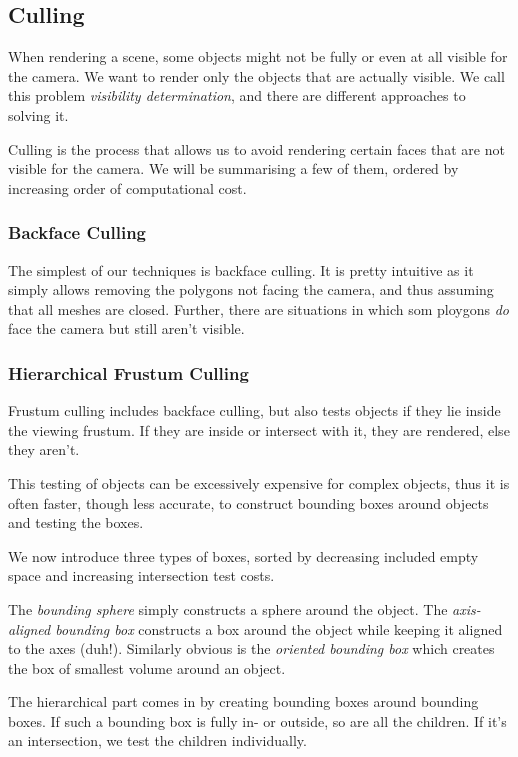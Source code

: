 \documentclass{panikzettel}
\begin{document}
\subsection{Culling}

When rendering a scene, some objects might not be fully or even at all visible for the camera. We want to render only the objects that are actually visible. We call this problem \emph{visibility determination}, and there are different approaches to solving it.

Culling is the process that allows us to avoid rendering certain faces that are not visible for the camera. We will be summarising a few of them, ordered by increasing order of computational cost.

\subsubsection*{Backface Culling}

The simplest of our techniques is backface culling. It is pretty intuitive as it simply allows removing the polygons not facing the camera, and thus assuming that all meshes are closed. Further, there are situations in which som ploygons \emph{do} face the camera but still aren't visible.

\subsubsection*{Hierarchical Frustum Culling}

Frustum culling includes backface culling, but also tests objects if they lie inside the viewing frustum. If they are inside or intersect with it, they are rendered, else they aren't.

This testing of objects can be excessively expensive for complex objects, thus it is often faster, though less accurate, to construct bounding boxes around objects and testing the boxes.

We now introduce three types of boxes, sorted by decreasing included empty space and increasing intersection test costs.

The \emph{bounding sphere} simply constructs a sphere around the object. The \emph{axis-aligned bounding box} constructs a box around the object while keeping it aligned to the axes (duh!). Similarly obvious is the \emph{oriented bounding box} which creates the box of smallest volume around an object.

The hierarchical part comes in by creating bounding boxes around bounding boxes. If such a bounding box is fully in- or outside, so are all the children. If it's an intersection, we test the children individually.
\end{document}
